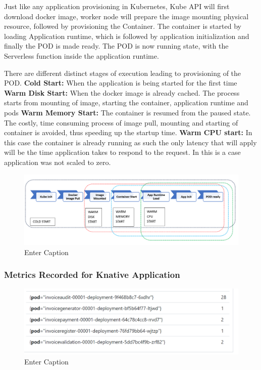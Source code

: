 \documentclass[12pt]{article}
\begin{document}
\begin{flushleft}
Just like any application provisioning in Kubernetes, Kube API will first download docker image, worker node will prepare the image mounting physical resource, followed by provisioning the Container. 
The container is started by loading Application runtime, which is followed by application initialization and finally the POD is made ready. The POD is now running state, with the Serverless function inside the application runtime. 

There are different distinct stages of execution leading to provisioning of the POD. 
\newline
\textbf{Cold Start:} When the application is being started for the first time
\newline
\textbf{Warm Disk Start:} When the docker image is already cached. The process starts from mounting of image, starting the container, application runtime and pods
\newline
\textbf{Warm Memory Start:} The container is resumed from the paused state. The costly, time consuming process of image pull, mounting and starting of container is avoided, thus speeding up the startup time.
\newline
\textbf{Warm CPU start:} In this case the container is already running as such the only latency that will apply will be the time application takes to respond to the request. In this is a case application was not scaled to zero.

\begin{figure}[h]
    \centering
    \includegraphics[width=1.0\linewidth]{images/Knative_lifecycle.PNG}
    \caption{Enter Caption}
    \label{fig:enter-label}
\end{figure}

\subsubsection{Metrics Recorded for Knative Application}

\begin{figure}[h]
    \centering
    \includegraphics[width=1.0\linewidth]{images/ColdStart_prometheus.PNG}
    \caption{Enter Caption}
    \label{fig:enter-label}
\end{figure}


\end{flushleft}
\end{document}
